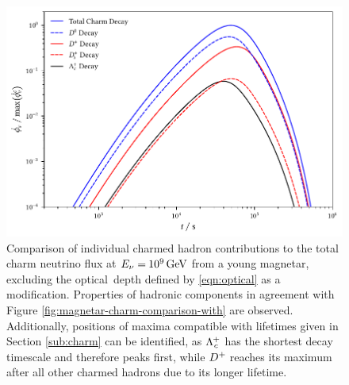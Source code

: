 \begin{figure}[H]
	\centering
	\includegraphics{../plots/build/magnetar_charm_decay_comparison_without.pdf}
	\caption[Magnetar $\nu \kern+0.5pt$ flux from $c$ decay excluding optical depth.]
			{Comparison of individual charmed hadron contributions to the total charm neutrino flux at
			 $E_\nu = \kern-0.5pt \qty{e9}{\giga\electronvolt}$ from a young magnetar, excluding the optical~depth
			 defined by \eqref{eqn:optical} as a modification. Properties of hadronic components in agreement with
			 Figure \ref{fig:magnetar-charm-comparison-with} are observed. Additionally, positions of maxima compatible
			 with lifetimes given in Section \ref{sub:charm} can be identified, as $\Lambda_{\kern+0.5pt c}^{\kern-0.5pt +}$
			 has the shortest decay timescale and therefore peaks first, while $D^+ \kern-0.5pt$ reaches its maximum after all other charmed
			 hadrons due to its longer lifetime.}
	\label{fig:magnetar-charm-comparison-without}
\end{figure}
